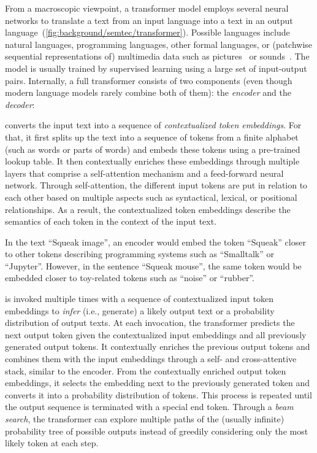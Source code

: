 From a macroscopic viewpoint, a transformer model employs several neural networks to translate a text from an input language into a text in an output language~(\cref{fig:background/semtec/transformer}).
Possible languages include natural languages, programming languages, other formal languages, or (patchwise sequential representations of) multimedia data such as pictures~\cite{dosovitskiy2021image} or sounds~\cite{gong2021ast}.
The model is usually trained by supervised learning using a large set of input-output pairs.
Internally, a full transformer consists of two components (even though modern language models rarely combine both of them): the \emph{encoder} and the \emph{decoder}:
%
\begin{description}[noextralabelsep]
	\item[The encoder] converts the input text into a sequence of \emph{contextualized token embeddings}.
	For that, it first splits up the text into a sequence of tokens from a finite alphabet (such as words or parts of words) and embeds these tokens using a pre-trained lookup table.
	It then contextually enriches these embeddings through multiple layers that comprise a self-attention mechanism and a feed-forward neural network.
	Through self-attention, the different input tokens are put in relation to each other based on multiple aspects such as syntactical, lexical, or positional relationships.
	As a result, the contextualized token embeddings describe the semantics of each token in the context of the input text.

	\begin{example}
		In the text ``Squeak image'', an encoder would embed the token ``Squeak'' closer to other tokens describing programming systems such as ``Smalltalk'' or ``Jupyter''.
		However, in the sentence ``Squeak mouse'', the same token would be embedded closer to toy-related tokens such as ``noise'' or ``rubber''.
	\end{example}

	\item[The decoder] is invoked multiple times with a sequence of contextualized input token embeddings to \emph{infer} (i.e., generate) a likely output text or a probability distribution of output texts.
	At each invocation, the transformer predicts the next output token given the contextualized input embeddings and all previously generated output tokens.
	It contextually enriches the previous output tokens and combines them with the input embeddings through a self- and cross-attentive stack, similar to the encoder.
	From the contextually enriched output token embeddings, it selects the embedding next to the previously generated token and converts it into a probability distribution of tokens.
	This process is repeated until the output sequence is terminated with a special end token.
	Through a \emph{beam search}, the transformer can explore multiple paths of the (usually infinite) probability tree of possible outputs instead of greedily considering only the most likely token at each step.


\end{description}

